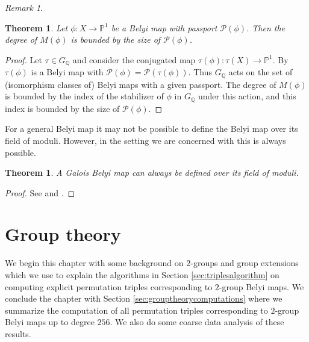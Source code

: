 \documentclass{dcthesis}
\newcommand{\PP}{\mathbb P}
\newcommand{\CC}{\mathbb C}
\newcommand{\QQ}{\mathbb Q}
\newcommand{\defi}[1]{\textsf{#1}}
\DeclareMathOperator{\Aut}{Aut}
\numberwithin{equation}{section}
\newtheorem{theorem}[equation]{Theorem}
\theoremstyle{definition}
\newtheorem{definition}[equation]{Definition}
\theoremstyle{remark}
\newtheorem{remark}[equation]{Remark}
\begin{document}
{{{\begin{remark}
    \end{remark}
    \begin{theorem}\label{thm:fieldofmoduli}
      Let $\phi:X\to\PP^1$ be a Belyi map
      with passport $\mathcal{P}(\phi)$.
      Then the degree
      of $M(\phi)$
      is bounded by the size of
      $\mathcal{P}(\phi)$.
    \end{theorem}
    \begin{proof}
      Let $\tau\in G_\QQ$ and consider the
      conjugated map
      $\tau(\phi)\colon \tau(X)\to\PP^1$.
      By \cite[Appendix]{jones_streit_manfred}
      $\tau(\phi)$ is a Belyi map with
      $\mathcal{P}(\phi) =
      \mathcal{P}(\tau(\phi))$.
      Thus $G_\QQ$ acts on the set
      of (isomorphism classes of) Belyi maps with
      a given passport.
      The degree of $M(\phi)$
      is bounded by the index of the
      stabilizer of $\phi$ in $G_\QQ$
      under this action,
      and this index is bounded by
      the size of $\mathcal{P}(\phi)$.
    \end{proof}
    For a general Belyi map it may not be possible
    to define the Belyi map over its field
    of moduli.
    However,
    in the setting we are concerned with
    this is always possible.
    \begin{theorem}
      \label{thm:galoisbelyimapoverfieldofmoduli}
      A Galois Belyi map can always be defined over
      its field of moduli.
    \end{theorem}
    \begin{proof}
      See 
      \cite[Proposition 2.5]{coombes_harbater}
      and
      \cite[Theorem 2.2]{kock}.
    \end{proof}
  }
}
\chapter{Group theory}{\label{chapter:grouptheory}
  We begin this chapter with some background
  on $2$-groups and group extensions which we
  use to explain the algorithms
  in Section \ref{sec:triplesalgorithm}
  on computing explicit permutation
  triples corresponding to $2$-group Belyi maps.
  We conclude the chapter with 
  Section \ref{sec:grouptheorycomputations}
  where we summarize the computation
  of all permutation triples corresponding
  to $2$-group Belyi maps up to degree $256$.
  We also do some coarse data analysis of these
  results.
}}
\end{document}
